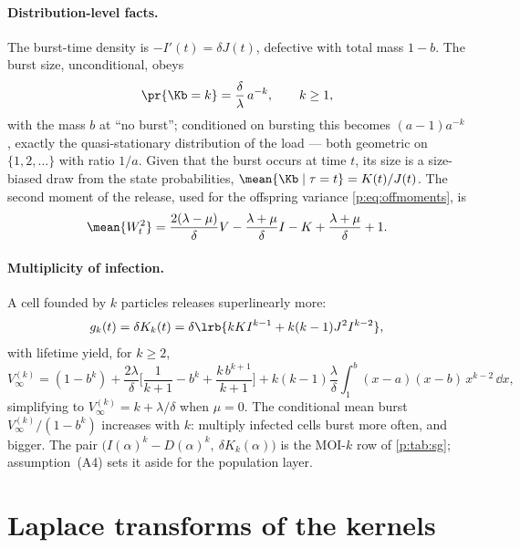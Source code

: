 \paragraph{Distribution-level facts.} The burst-time density is
$-I'(t)=\delta J(t)$, defective with total mass $1-b$. The burst size,
unconditional, obeys
\begin{equation}
\pr{\Kb=k}=\frac{\delta}{\lambda}\,a^{-k},\qquad k\ge1,
\label{p:eq:burstlaw}
\end{equation}
with the mass $b$ at ``no burst''; conditioned on bursting this becomes
$(a-1)a^{-k}$, exactly the quasi-stationary distribution of the load
\cite{van2011quasi} --- both geometric on $\{1,2,\ldots\}$ with ratio $1/a$.
Given that the burst occurs at time $t$, its size is a size-biased draw from
the state probabilities, $\mean{\Kb\mid\tau=t}=K(t)/J(t)$. The second moment
of the release, used for the offspring variance \cref{p:eq:offmoments}, is
\begin{equation}
\mean{W_t^2}
=\frac{2(\lambda-\mu)}{\delta}V-\frac{\lambda+\mu}{\delta}I-K
+\frac{\lambda+\mu}{\delta}+1.
\label{p:eq:EW2}
\end{equation}

\paragraph{Multiplicity of infection.} A cell founded by $k$ particles
releases superlinearly more:
\begin{equation}
g_k(t)=\delta K_k(t)
=\delta\lrb{kK I^{k-1}+k(k-1)J^2I^{k-2}},
\label{p:eq:gk}
\end{equation}
with lifetime yield, for $k\ge2$,
\begin{equation}
V_\infty^{(k)}
=(1-b^k)
+\frac{2\lambda}{\delta}\Biggl[\frac{1}{k+1}-b^k+\frac{k\,b^{k+1}}{k+1}\Biggr]
+k(k-1)\frac{\lambda}{\delta}\int_1^b (x-a)(x-b)\,x^{k-2}\,\dd x,
\label{p:eq:Vk}
\end{equation}
simplifying to $V_\infty^{(k)}=k+\lambda/\delta$ when $\mu=0$. The
conditional mean burst $V_\infty^{(k)}/(1-b^k)$ increases with $k$: multiply
infected cells burst more often, and bigger. The pair
$\bigl(I(\alpha)^k-D(\alpha)^k,\ \delta K_k(\alpha)\bigr)$ is the MOI-$k$
row of \cref{p:tab:sg}; assumption~(A4) sets it aside for the population
layer.

\section{Laplace transforms of the kernels}
\label{p:app:transforms}

